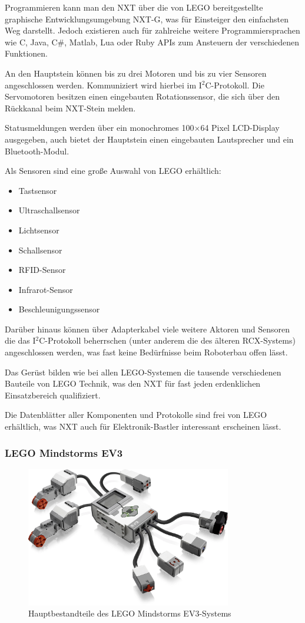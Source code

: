 Programmieren kann man den NXT über die von LEGO bereitgestellte graphische Entwicklungsumgebung NXT-G, was für Einsteiger den einfachsten Weg darstellt. Jedoch existieren auch für zahlreiche weitere Programmiersprachen wie C, Java, C\#, Matlab, Lua oder Ruby APIs zum Ansteuern der verschiedenen Funktionen.

An den Hauptstein können bis zu drei Motoren und bis zu vier Sensoren angeschlossen werden. Kommuniziert wird hierbei im I$^2$C-Protokoll. Die Servomotoren besitzen einen eingebauten Rotationssensor, die sich über den Rückkanal beim NXT-Stein melden.

Statusmeldungen werden über ein monochromes 100$\times$64 Pixel LCD-Display ausgegeben, auch bietet der Hauptstein einen eingebauten Lautsprecher und ein Bluetooth-Modul.

Als Sensoren sind eine große Auswahl von LEGO erhältlich:
\begin{itemize}
\item Tastsensor
\item Ultraschallsensor
\item Lichtsensor
\item Schallsensor
\item RFID-Sensor
\item Infrarot-Sensor
\item Beschleunigungssensor
\end{itemize}

Darüber hinaus können über Adapterkabel viele weitere Aktoren und Sensoren die das I$^2$C-Protokoll beherrschen (unter anderem die des älteren RCX-Systems) angeschlossen werden, was fast keine Bedürfnisse beim Roboterbau offen lässt.

Das Gerüst bilden wie bei allen LEGO-Systemen die tausende verschiedenen Bauteile von LEGO Technik, was den NXT für fast jeden erdenklichen Einsatzbereich qualifiziert.

Die Datenblätter aller Komponenten und Protokolle sind frei von LEGO erhältlich, was NXT auch für Elektronik-Bastler interessant erscheinen lässt.

\subsubsection{LEGO Mindstorms EV3}

\begin{figure}[h]
\centering
\includegraphics[width=0.8\textwidth]{Bilder/MatsAndMets/ev3}
\caption{Hauptbestandteile des LEGO Mindstorms EV3-Systems}
\label{fig:ev3}
\end{figure}

